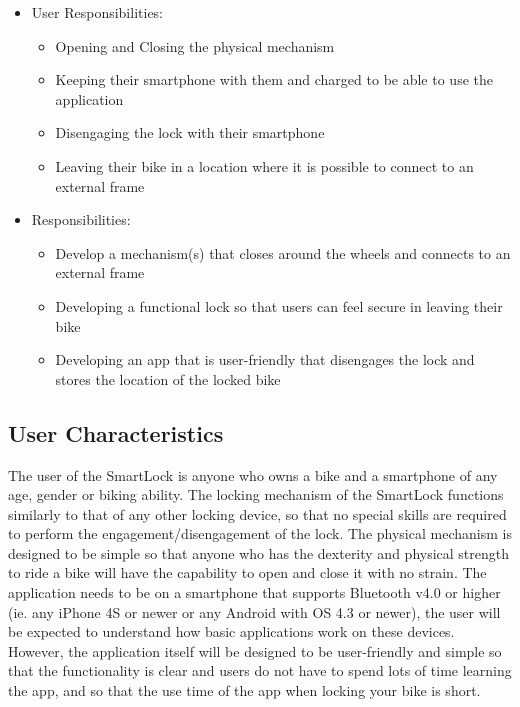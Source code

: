 \documentclass[12pt]{article}
\begin{document}
\begin{itemize}
\item User Responsibilities:
\begin{itemize}
\item Opening and Closing the physical mechanism
\item Keeping their smartphone with them and charged to be able to use the application
\item Disengaging the lock with their smartphone
\item Leaving their bike in a location where it is possible to connect to an external frame
\end{itemize}
\item \progname{} Responsibilities:
\begin{itemize}
\item Develop a mechanism(s) that closes around the wheels and connects to an external frame
\item Developing a functional lock so that users can feel secure in leaving their bike
\item Developing an app that is user-friendly that disengages the lock and stores the location of the locked bike
\end{itemize}
\end{itemize}

\subsection{User Characteristics} \label{SecUserCharacteristics}


The user of the SmartLock is anyone who owns a bike and a smartphone of any age, gender or biking ability.  The locking mechanism of the SmartLock functions similarly to that of any other locking device, so that no special skills are required to perform the engagement/disengagement of the lock.  The physical mechanism is designed to be simple so that anyone who has the dexterity and physical strength to ride a bike will have the capability to open and close it with no strain.  The application needs to be on a smartphone that supports Bluetooth v4.0 or higher (ie. any iPhone 4S or newer or any Android with OS 4.3 or newer), the user will be expected to understand how basic applications work on these devices.  However, the application itself will be designed to be user-friendly and simple so that the functionality is clear and users do not have to spend lots of time learning the app, and so that the use time of the app when locking your bike is short. 
\end{document}
